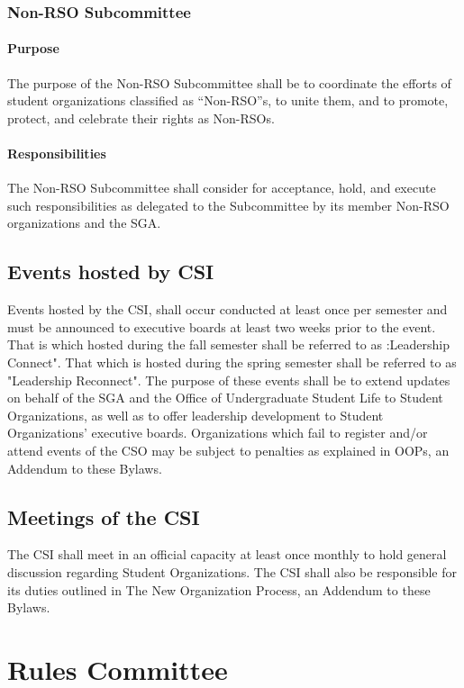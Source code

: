 \documentclass[12pt]{scrreprt}
\begin{document}
\subsubsection{Non-RSO Subcommittee}

\paragraph{Purpose}
​The purpose of the Non-RSO Subcommittee shall be to coordinate the efforts of
student organizations classified as “Non-RSO”s, to unite them, and to promote, protect, and
celebrate their rights as Non-RSOs.

\paragraph{Responsibilities}
The Non-RSO Subcommittee shall consider for acceptance, hold, and
execute such responsibilities as delegated to the Subcommittee by its member Non-RSO
organizations and the SGA.

\subsection{Events hosted by CSI}
Events hosted by the CSI,  shall occur conducted at least once per semester and must be announced to executive boards at least two weeks prior to the event. That is which hosted during the fall semester shall be referred to as :Leadership Connect". That which is hosted during the spring semester shall be referred to as "Leadership Reconnect". The purpose of these events shall be to extend updates on behalf of the SGA
and the Office of Undergraduate Student Life to Student Organizations, as well as to offer
leadership development to Student Organizations’ executive boards. Organizations which fail to register and/or attend events of the CSO may be subject to penalties as explained in OOPs, an Addendum to these Bylaws.

\subsection{Meetings of the CSI}
The CSI shall meet in an official capacity at least once monthly to hold general discussion regarding Student Organizations.
The CSI shall also be responsible for its duties outlined in The New Organization Process, an 
Addendum to these Bylaws.

\section{Rules Committee}
\end{document}
